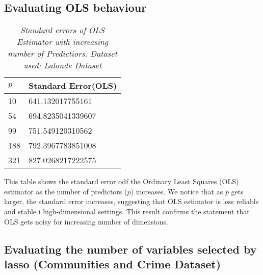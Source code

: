 % 




\subsection{Evaluating OLS behaviour}
\begin{table}[h!]
\renewcommand{\arraystretch}{1.5}
\centering
\begin{tabular}{||l l||} 
 \hline
 \hline
 $p$ & Standard Error(OLS) \\ [0.5ex] 
 \hline\hline
 10 & 641.132017755161 \\ 
 54 & 694.8235041339607  \\
 99 & 751.549120310562 \\ 
 188 & 792.3967783851008 \\ 
 321 & 827.0268217222575 \\[1ex] 
 \hline
\end{tabular}
\caption{\textit{Standard errors of OLS Estimator with increasing number of Predictiors. Dataset used: Lalonde Dataset}}
\label{table:1}
\end{table}
This table shows the standard error odf the Ordinary Least Squares (OLS) estimator as the number of predictors ($p$) increases. We notice that as $p$ gets larger, the standard error increases, suggesting that OLS estimator is less reliable and stable i high-dimensional settings. This result confirms the statement that OLS gets noisy for increasing number of dimensions. 

\subsection{Evaluating the number of variables selected by lasso (Communities and Crime Dataset)}

